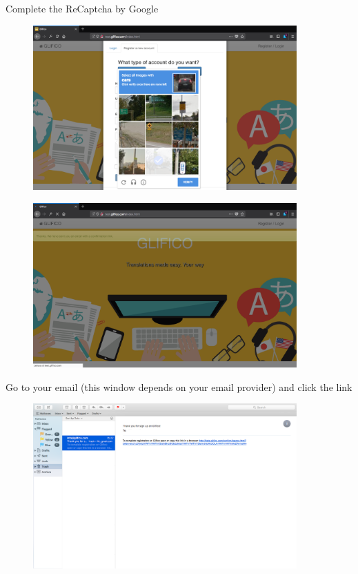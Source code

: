 \documentclass[11 pt, a4paper]{article}
\begin{document}
\clearpage
Complete the ReCaptcha by Google
\begin{figure}[H]
\centering
\includegraphics[width=0.9\textwidth]{translator_register4.png}
\end{figure}

\begin{figure}[H]
\centering
\includegraphics[width=0.9\textwidth]{translator_register5.png}
\end{figure}

\clearpage
Go to your email (this window depends on your email provider) and click the link
\begin{figure}[H]
\centering
\includegraphics[width=0.9\textwidth]{translator_register6.png}
\end{figure}
\end{document}
